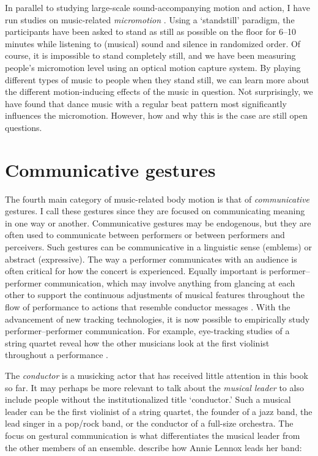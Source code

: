 In parallel to studying large-scale sound-accompanying motion and action, I have run studies on music-related \emph{micromotion} \citep{jensenius_exploring_2017,gonzalez_sanchez_correspondences_2018,gonzalez_sanchez_analysis_2019,zelechowska_headphones_2020}. Using a `standstill' paradigm, the participants have been asked to stand as still as possible on the floor for 6--10 minutes while listening to (musical) sound and silence in randomized order. Of course, it is impossible to stand completely still, and we have been measuring people's micromotion level using an optical motion capture system. By playing different types of music to people when they stand still, we can learn more about the different motion-inducing effects of the music in question. Not surprisingly, we have found that dance music with a regular beat pattern most significantly influences the micromotion. However, how and why this is the case are still open questions.


\section{Communicative gestures}

The fourth main category of music-related body motion is that of \emph{communicative} gestures. I call these gestures since they are focused on communicating meaning in one way or another. Communicative gestures may be endogenous, but they are often used to communicate between performers or between performers and perceivers. Such gestures can be communicative in a linguistic sense (emblems) or abstract (expressive). The way a performer communicates with an audience is often critical for how the concert is experienced. Equally important is performer--performer communication, which may involve anything from glancing at each other to support the continuous adjustments of musical features throughout the flow of performance to actions that resemble conductor messages \citep{timmers_together_2022}. With the advancement of new tracking technologies, it is now possible to empirically study performer--performer communication. For example, eye-tracking studies of a string quartet reveal how the other musicians look at the first violinist throughout a performance \citep{bishop_move_2021}.

The \emph{conductor} is a musicking actor that has received little attention in this book so far. It may perhaps be more relevant to talk about the \emph{musical leader} to also include people without the institutionalized title `conductor.' Such a musical leader can be the first violinist of a string quartet, the founder of a jazz band, the lead singer in a pop/rock band, or the conductor of a full-size orchestra. The focus on gestural communication is what differentiates the musical leader from the other members of an ensemble.  \citet[p.243]{davidson_body_2002} describe how Annie Lennox leads her band:


